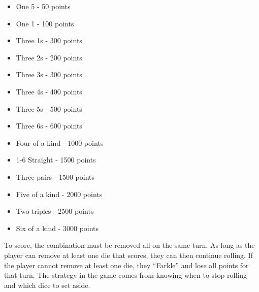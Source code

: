 \documentclass{article}
\begin{document}
\begin{itemize}
\item One 5 - 50 points
\item One 1 - 100 points
\item Three 1s - 300 points
\item Three 2s - 200 points
\item Three 3s - 300 points
\item Three 4s - 400 points
\item Three 5s - 500 points
\item Three 6s - 600 points
\item Four of a kind - 1000 points
\item 1-6 Straight   - 1500 points
\item Three pairs    - 1500 points
\item Five of a kind - 2000 points
\item Two triples    - 2500 points
\item Six of a kind  - 3000 points
\end{itemize}

To score, the combination must be removed all on the same turn.  As long as the
player can remove at least one die that scores, they can then continue rolling.
If the player cannot remove at least one die, they ``Farkle'' and lose all
points for that turn.  The strategy in the game comes from knowing when to stop
rolling and which dice to set aside.
\end{document}
